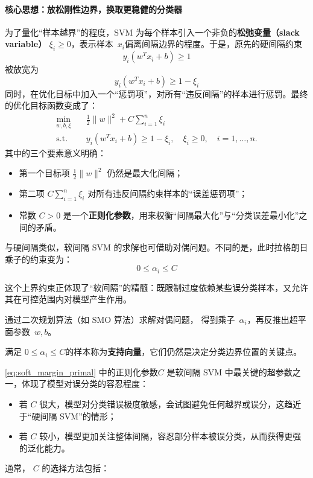 \paragraph{核心思想：放松刚性边界，换取更稳健的分类器}
为了量化“样本越界”的程度，SVM 为每个样本引入一个非负的\textbf{松弛变量（slack variable）} $\xi_i \geq 0$，表示样本~$x_i$偏离间隔边界的程度。于是，原先的硬间隔约束
$$
y_i \left( w^T x_i + b\right) \ge 1
$$
被放宽为
$$
y_i \left( w^T x_i + b\right) \ge 1-\xi_i
$$
同时，在优化目标中加入一个“惩罚项”，对所有“违反间隔”的样本进行惩罚。最终的优化目标函数变成了：\begin{equation}\label{eq:soft_margin_primal}
\begin{aligned}
\min_{w,b,\xi} \quad & \frac{1}{2} \|w\|^2 + C \sum_{i=1}^n \xi_i \\
\text{s.t.} \quad & y_i(w^T x_i + b) \geq 1 - \xi_i, \quad \xi_i \geq 0, \quad i=1,\dots,n.
\end{aligned}
\end{equation}
其中的三个要素意义明确：
\begin{itemize}
\item 第一个目标项 $\frac{1}{2} \|w\|^2$ 仍然是最大化间隔；
\item 第二项 $C \sum_{i=1}^n \xi_i$ 对所有违反间隔约束样本的“误差惩罚项”；
\item 常数 $C > 0$ 是一个\textbf{正则化参数}，用来权衡“间隔最大化”与“分类误差最小化”之间的矛盾。
\end{itemize}
与硬间隔类似，软间隔 SVM 的求解也可借助对偶问题。不同的是，此时拉格朗日乘子的约束变为：
$$
0\le \alpha_i \le C
$$

这个上界约束正体现了“软间隔”的精髓：既限制过度依赖某些误分类样本，又允许其在可控范围内对模型产生作用。

通过二次规划算法（如 SMO 算法）求解对偶问题， 
得到乘子~$\alpha_i$，再反推出超平面参数~$w, b$。 

满足 $0\le \alpha_i \le C $的样本称为{\bf 支持向量}，它们仍然是决定分类边界位置的关键点。

\eqref{eq:soft_margin_primal} 中的正则化参数$C$ 是软间隔 SVM 中最关键的超参数之一，体现了模型对误分类的容忍程度：

\begin{itemize}
\item  若 $C$ 很大，模型对分类错误极度敏感，会试图避免任何越界或误分，这趋近于“硬间隔 SVM”的情形；
\item 若 $C$ 较小，模型更加关注整体间隔，容忍部分样本被误分类，从而获得更强的泛化能力。
\end{itemize}
通常， $C$  的选择方法包括：


